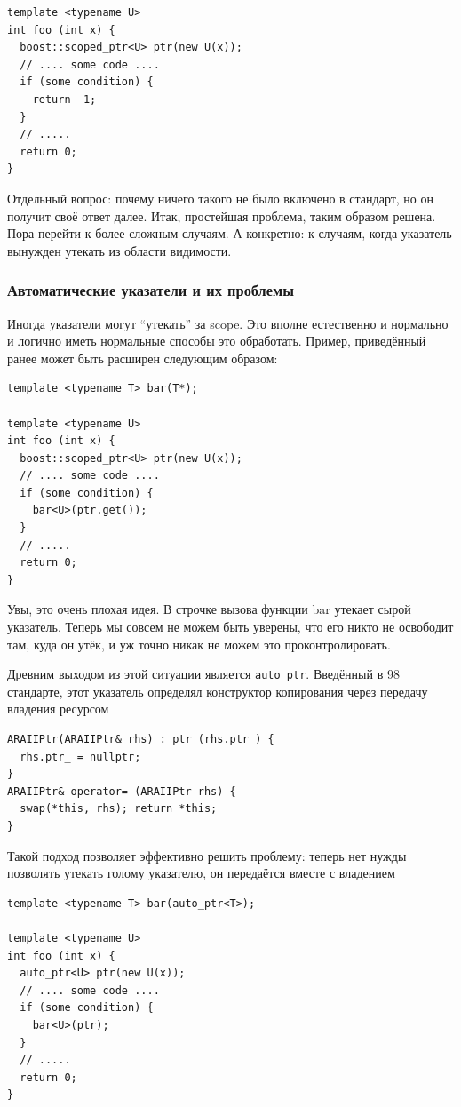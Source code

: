 \documentclass[a4paper,12pt,oneside]{article}
\begin{document}
\begin{lstlisting}
template <typename U>
int foo (int x) {
  boost::scoped_ptr<U> ptr(new U(x));
  // .... some code ....
  if (some condition) {
    return -1;
  }
  // .....
  return 0;
}
\end{lstlisting}

Отдельный вопрос: почему ничего такого не было включено в стандарт, но он получит своё ответ далее. Итак, простейшая проблема, таким образом решена. Пора перейти к более сложным случаям. А конкретно: к случаям, когда указатель вынужден утекать из области видимости.

\subsubsection{Автоматические указатели и их проблемы}\label{COAP}

Иногда указатели могут ``утекать'' за scope. Это вполне естественно и нормально и логично иметь нормальные способы это обработать. Пример, приведённый ранее может быть расширен следующим образом:

\begin{lstlisting}
template <typename T> bar(T*);

template <typename U>
int foo (int x) {
  boost::scoped_ptr<U> ptr(new U(x));
  // .... some code ....
  if (some condition) {
    bar<U>(ptr.get());
  }
  // .....
  return 0;
}
\end{lstlisting}

Увы, это очень плохая идея. В строчке вызова функции bar утекает сырой указатель. Теперь мы совсем не можем быть уверены, что его никто не освободит там, куда он утёк, и уж точно никак не можем это проконтролировать.

Древним выходом из этой ситуации является \lstinline!auto_ptr!. Введённый в 98 стандарте, этот указатель определял конструктор копирования через передачу владения ресурсом

\begin{lstlisting}
ARAIIPtr(ARAIIPtr& rhs) : ptr_(rhs.ptr_) { 
  rhs.ptr_ = nullptr; 
}
ARAIIPtr& operator= (ARAIIPtr rhs) { 
  swap(*this, rhs); return *this; 
}
\end{lstlisting}

Такой подход позволяет эффективно решить проблему: теперь нет нужды позволять утекать голому указателю, он передаётся вместе с владением

\begin{lstlisting}
template <typename T> bar(auto_ptr<T>);

template <typename U>
int foo (int x) {
  auto_ptr<U> ptr(new U(x));
  // .... some code ....
  if (some condition) {
    bar<U>(ptr);
  }
  // .....
  return 0;
}
\end{lstlisting}
\end{document}
